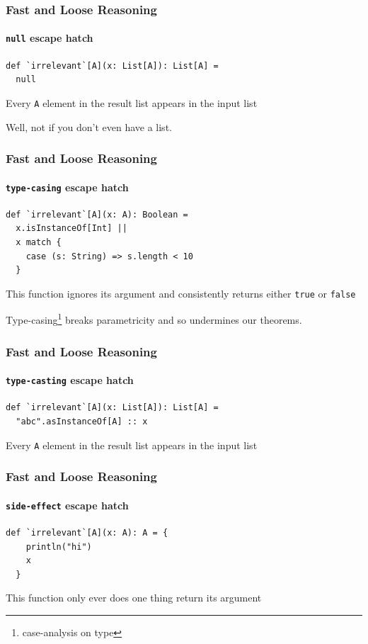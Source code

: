 \begin{frame}[fragile]
\frametitle{Fast and Loose Reasoning}
\framesubtitle{\lstinline{null} escape hatch}
\begin{lstlisting}[style=scala]
def `irrelevant`[A](x: List[A]): List[A] = 
  null
\end{lstlisting}
\begin{theorem}Every \lstinline{A} element in the result list appears in the input list\end{theorem}
Well, not if you don't even have a list.
\end{frame}

\begin{frame}[fragile]
\frametitle{Fast and Loose Reasoning}
\framesubtitle{\lstinline{type-casing} escape hatch}
\begin{lstlisting}[style=scala]
def `irrelevant`[A](x: A): Boolean = 
  x.isInstanceOf[Int] ||
  x match {
    case (s: String) => s.length < 10
  }
\end{lstlisting}
\begin{theorem}This function ignores its argument and consistently returns either \lstinline{true} or \lstinline{false}\end{theorem}
Type-casing\footnote{case-analysis on type} breaks parametricity and so undermines our theorems.
\end{frame}

\begin{frame}[fragile]
\frametitle{Fast and Loose Reasoning}
\framesubtitle{\lstinline{type-casting} escape hatch}
\begin{lstlisting}[style=scala]
def `irrelevant`[A](x: List[A]): List[A] = 
  "abc".asInstanceOf[A] :: x  
\end{lstlisting}
\begin{theorem}Every \lstinline{A} element in the result list appears in the input list\end{theorem}
\end{frame}

\begin{frame}[fragile]
\frametitle{Fast and Loose Reasoning}
\framesubtitle{\lstinline{side-effect} escape hatch}
\begin{lstlisting}[style=scala]
def `irrelevant`[A](x: A): A = {
    println("hi")
    x
  }
\end{lstlisting}
\begin{theorem}This function only ever does one thing \textemdash return its argument \end{theorem}
\end{frame}

